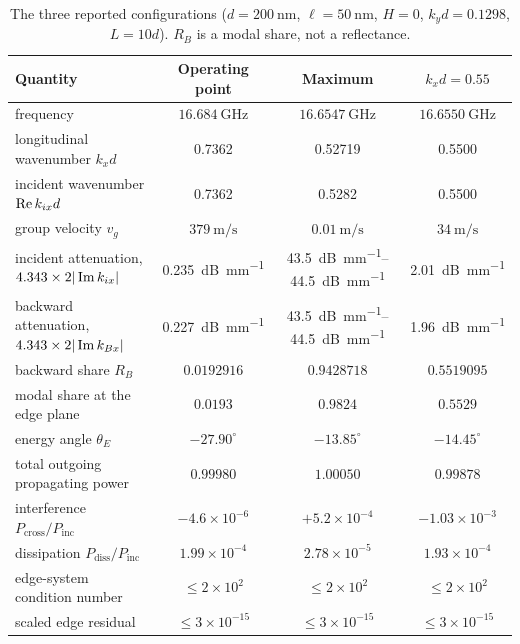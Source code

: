 \begin{table}[t]
\centering
\caption{The three reported configurations ($d=\SI{200}{\nano\metre}$, $\ell=\SI{50}{\nano\metre}$, $H=0$, $k_yd=0.1298$, $L=10d$). $R_B$ is a modal share, not a reflectance.}
\label{tab:configurations}
\scriptsize
\begin{tabular}{@{}lccc@{}}
\toprule
Quantity & Operating point & Maximum & $k_xd=0.55$ \\
\midrule
frequency & $\SI{16.684}{\giga\hertz}$ & $\SI{16.6547}{\giga\hertz}$ & $\SI{16.6550}{\giga\hertz}$ \\
longitudinal wavenumber $k_xd$ & 0.7362 & 0.52719 & 0.5500 \\
incident wavenumber $\operatorname{Re} k_{ix}d$ & 0.7362 & 0.5282 & 0.5500 \\
group velocity $v_g$ & $\SI{379}{\metre\per\second}$ & $\SI{0.01}{\metre\per\second}$ & $\SI{34}{\metre\per\second}$ \\
incident attenuation, $4.343\times2|\operatorname{Im} k_{ix}|$ & \SI{0.235}{\deci\bel\per\milli\metre} & \SIrange{43.5}{44.5}{\deci\bel\per\milli\metre} & \SI{2.01}{\deci\bel\per\milli\metre} \\
backward attenuation, $4.343\times2|\operatorname{Im} k_{Bx}|$ & \SI{0.227}{\deci\bel\per\milli\metre} & \SIrange{43.5}{44.5}{\deci\bel\per\milli\metre} & \SI{1.96}{\deci\bel\per\milli\metre} \\
backward share $R_B$ & $0.0192916$ & $0.9428718$ & $0.5519095$ \\
modal share at the edge plane & $0.0193$ & $0.9824$ & $0.5529$ \\
energy angle $\theta_E$ & $-27.90^{\circ}$ & $-13.85^{\circ}$ & $-14.45^{\circ}$ \\
total outgoing propagating power & $0.99980$ & $1.00050$ & $0.99878$ \\
interference $P_{\text{cross}}/P_{\text{inc}}$ & $-4.6\times10^{-6}$ & $+5.2\times10^{-4}$ & $-1.03\times10^{-3}$ \\
dissipation $P_{\text{diss}}/P_{\text{inc}}$ & $1.99\times10^{-4}$ & $2.78\times10^{-5}$ & $1.93\times10^{-4}$ \\
edge-system condition number & $\le 2\times10^{2}$ & $\le 2\times10^{2}$ & $\le 2\times10^{2}$ \\
scaled edge residual & $\le3\times10^{-15}$ & $\le3\times10^{-15}$ & $\le3\times10^{-15}$ \\
\bottomrule
\end{tabular}
\end{table}


